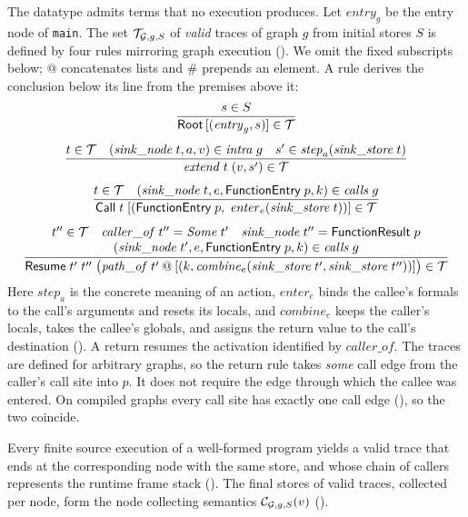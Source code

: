 The datatype admits terms that no execution produces. Let $\mathit{entry}_g$ be the entry node of \texttt{main}. The set
$\mathcal{T}_{\mathcal{G},g,S}$ of \emph{valid} traces of graph $g$ from initial stores
$S$ is defined by four rules mirroring graph execution
(). We omit the fixed subscripts below;
$@$ concatenates lists and $\#$ prepends an element. A rule derives the
conclusion below its line from the premises above it:
\begin{gather*}
\frac{s \in S}{\textsf{Root}\,[(\mathit{entry}_g, s)] \in \mathcal{T}}
\\[1ex]
\frac{t \in \mathcal{T} \quad (\mathit{sink\_node}\;t, a, v) \in \mathit{intra}\;g \quad s' \in \mathit{step}_a(\mathit{sink\_store}\;t)}{\mathit{extend}\;t\;(v, s') \in \mathcal{T}}
\\[1ex]
\frac{t \in \mathcal{T} \quad (\mathit{sink\_node}\;t, e, \textsf{FunctionEntry}\;p, k) \in \mathit{calls}\;g}{\textsf{Call}\;t\;[(\textsf{FunctionEntry}\;p,\; \mathit{enter}_e(\mathit{sink\_store}\;t))] \in \mathcal{T}}
\\[1ex]
\frac{\begin{array}{c}t'' \in \mathcal{T} \quad \mathit{caller\_of}\;t'' = \mathit{Some}\;t' \quad \mathit{sink\_node}\;t'' = \textsf{FunctionResult}\;p\\ (\mathit{sink\_node}\;t', e, \textsf{FunctionEntry}\;p, k) \in \mathit{calls}\;g\end{array}}{\textsf{Resume}\;t'\;t''\;\bigl(\mathit{path\_of}\;t' \mathbin{@} [(k, \mathit{combine}_e(\mathit{sink\_store}\;t', \mathit{sink\_store}\;t''))]\bigr) \in \mathcal{T}}
\end{gather*}
Here $\mathit{step}_a$ is the concrete meaning of an action, $\mathit{enter}_e$
binds the callee's formals to the call's arguments and resets its locals, and
$\mathit{combine}_e$ keeps the caller's locals, takes the callee's globals, and
assigns the return value to the call's destination ().
A return resumes the activation identified by $\mathit{caller\_of}$.
The traces are defined for arbitrary graphs, so the return rule takes \emph{some} call edge from the caller's call site into $p$. It does
not require the edge through which the callee was entered. On compiled graphs
every call site has exactly one call edge (), so
the two coincide.

Every finite source execution of a well-formed program yields a valid trace
that ends at the corresponding node with the same store, and whose chain of
callers represents the runtime frame stack
(). The final stores of valid traces,
collected per node, form the node collecting semantics
$\mathcal{C}_{\mathcal{G},g,S}(v)$ ().

